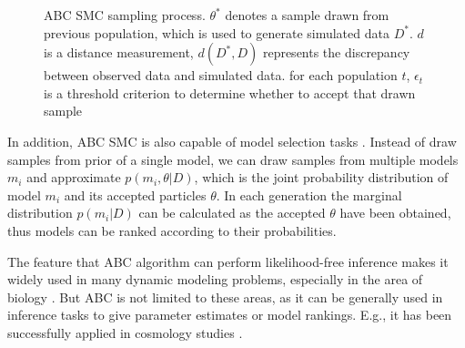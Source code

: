 \begin{figure}[t]
    \begin{center}
    \end{center}

    \caption[ABC SMC sampling process]%
    {ABC SMC sampling process. $\theta^*$ denotes a sample drawn from previous population, which is used to generate simulated data $D^*$. $d$ is a distance measurement, $d(D^*,D)$ represents the discrepancy between observed data and simulated data. for each population $t$, $\epsilon_t$ is a threshold criterion to determine whether to accept that drawn sample}
    \label{fig:smc}

\end{figure}

In addition, ABC SMC is also capable of model selection tasks \cite{model_compare}. Instead of draw samples from prior of a single model, we can draw samples from multiple models $m_i$ and approximate $p(m_i, \theta|D)$, which is the joint probability distribution of model $m_i$ and its accepted particles $\theta$. In each generation the marginal distribution $p(m_i|D)$ can be calculated as the accepted ${\theta}$ have been obtained, thus models can be ranked according to their probabilities.

The feature that ABC algorithm can perform likelihood-free inference makes it widely used in many dynamic modeling problems, especially in the area of biology \cite{ref:abcsysbio, ref:compare, ref:disease}. But ABC is not limited to these areas, as it can be generally used in inference tasks to give parameter estimates or model rankings. E.g., it has been successfully applied in cosmology studies \cite{cosmology}.



